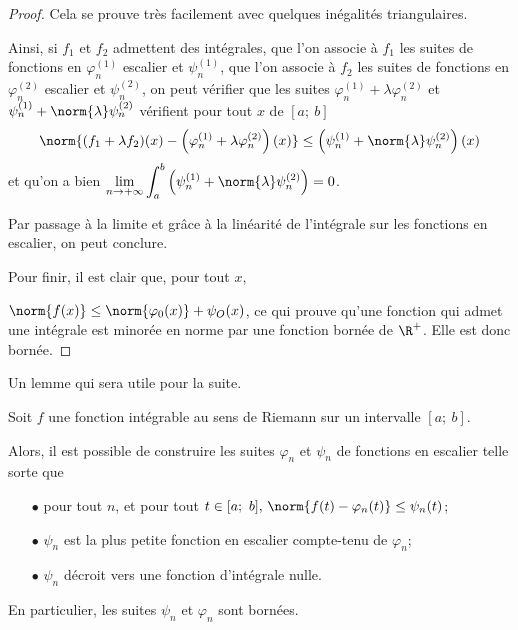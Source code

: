 \begin{proof}
Cela se prouve très facilement avec quelques inégalités triangulaires.

Ainsi, si $f_1$ et $f_2$ admettent des intégrales, que l'on associe à $f_1$ les suites de fonctions en $\varphi_n^{(1)}$ escalier et $\psi_n^{(1)}$, que l'on associe à $f_2$ les suites de fonctions en $\varphi_n^{(2)}$ escalier et $\psi_n^{(2)}$, on peut vérifier que les suites $\varphi_n^{(1)} + \lambda \varphi_n^{(2)}$ et $\psi_n^{(1)} + \norm{\lambda} \psi_n^{(2)}$ vérifient pour tout $x$ de $[a;~b]$
\[\norm{(f_1 + \lambda f_2)(x) - \left(\varphi_n^{(1)} + \lambda \varphi_n^{(2)}\right)(x)} \leq \left(\psi_n^{(1)} + \norm{\lambda} \psi_n^{(2)}\right)(x)\]
et qu'on a bien $\lim \limits_{n \to +\infty} \displaystyle{\int_a^b} \left(\psi_n^{(1)} + \norm{\lambda} \psi_n^{(2)}\right) = 0$.

Par passage à la limite et grâce à la linéarité de l'intégrale sur les fonctions en escalier, on peut conclure.

Pour finir, il est clair que, pour tout $x$,

$\norm{f(x)} \leq \norm{\varphi_0(x)} + \psi_O(x)$, ce qui prouve qu'une fonction qui admet une intégrale est minorée en norme par une fonction bornée de $\R^{+}$. Elle est donc bornée.
\end{proof}

Un lemme qui sera utile pour la suite.

\begin{lem}
Soit $f$ une fonction intégrable au sens de Riemann sur un intervalle $[a;~b]$.

Alors, il est possible de construire les suites $\varphi_n$ et $\psi_n$ de fonctions en escalier telle sorte que 
\begin{itemize}
\item[$\bullet$] pour tout $n$, et pour tout $t \in [a;~b], \, \norm{f(t)-\varphi_n(t)} \leq \psi_n(t)$;
\item[$\bullet$] $\psi_n$ est la plus petite fonction en escalier compte-tenu de $\varphi_n$;
\item[$\bullet$] $\psi_n$ décroit vers une fonction d'intégrale nulle.
\end{itemize}

En particulier, les suites $\psi_n$ et $\varphi_n$ sont bornées.
\end{lem}


